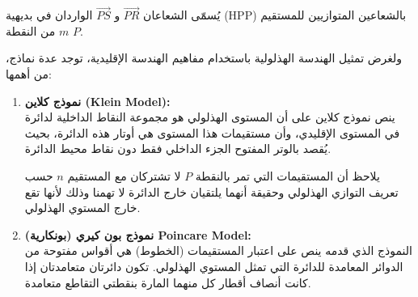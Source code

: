 \begin{definition}
	يُسمّى الشعاعان $\overrightarrow{PR}$ و $\overrightarrow{PS}$ الواردان في بديهية (HPP) بالشعاعين المتوازيين للمستقيم $m$ من النقطة $P$.
	
	ولغرض تمثيل الهندسة الهذلولية باستخدام مفاهيم الهندسة الإقليدية، توجد عدة نماذج، من أهمها:
	
	\begin{enumerate}
		\item \textbf{نموذج كلاين (Klein Model):} \\
		ينص نموذج كلاين على أن المستوى الهذلولي هو مجموعة النقاط الداخلية لدائرة في المستوى الإقليدي، وأن مستقيمات هذا المستوى هي أوتار هذه الدائرة، بحيث يُقصد بالوتر المفتوح الجزء الداخلي فقط دون نقاط محيط الدائرة.
	
يلاحظ أن المستقيمات التي تمر بالنقطة $P$ لا تشتركان مع المستقيم $n$ حسب تعريف التوازي الهذلولي وحقيقة أنهما يلتقيان خارج الدائرة لا تهمنا وذلك لأنها تقع خارج المستوي الهذلولي.


\item \textbf{نموذج بون كيري (بونكارية) Poincare Model:}\\ النموذج الذي قدمه ينص على اعتبار المستقيمات (الخطوط) هي أقواس مفتوحة من الدوائر المعامدة للدائرة التي تمثل المستوي الهذلولي. تكون دائرتان متعامدتان إذا كانت أنصاف أقطار كل منهما المارة بنقطتي التقاطع متعامدة.

\end{enumerate}
\end{definition}
